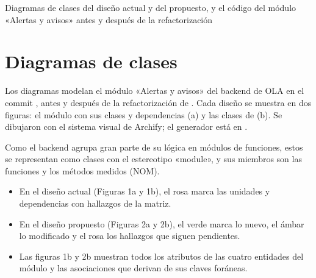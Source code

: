 \documentclass[11pt,a4paper]{article}
\begin{document}
        {Diagramas de clases del diseño actual y del propuesto, y el código del módulo «Alertas y avisos» antes y después de la refactorización}

{\hypersetup{linkcolor=black}\renewcommand{\contentsname}{\sffamily\color{azul}Índice}\tableofcontents}
\thispagestyle{plain}
\newpage

\section{Diagramas de clases}

Los diagramas modelan el módulo «Alertas y avisos» del backend de OLA en el commit , antes y después de la refactorización de . Cada diseño se muestra en dos figuras: el módulo con sus clases y dependencias (a) y las clases de  (b). Se dibujaron con el sistema visual de Archify; el generador está en .

Como el backend agrupa gran parte de su lógica en módulos de funciones, estos se representan como clases con el estereotipo «module», y sus miembros son las funciones y los métodos medidos (NOM).

\begin{itemize}
  \item En el diseño actual (Figuras 1a y 1b), el rosa marca las unidades y dependencias con hallazgos de la matriz.
  \item En el diseño propuesto (Figuras 2a y 2b), el verde marca lo nuevo, el ámbar lo modificado y el rosa los hallazgos que siguen pendientes.
  \item Las figuras 1b y 2b muestran todos los atributos de las cuatro entidades del módulo y las asociaciones que derivan de sus claves foráneas.
\end{itemize}

\end{document}
